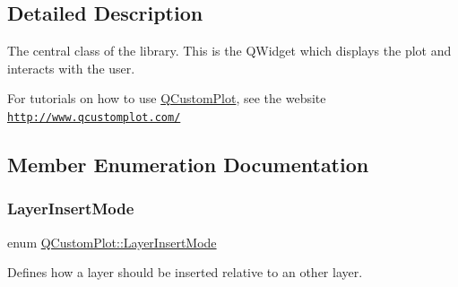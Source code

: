 \subsection{Detailed Description}
The central class of the library. This is the Q\+Widget which displays the plot and interacts with the user. 

For tutorials on how to use \hyperlink{class_q_custom_plot}{Q\+Custom\+Plot}, see the website~\newline
\href{http://www.qcustomplot.com/}{\tt http\+://www.\+qcustomplot.\+com/} 

\subsection{Member Enumeration Documentation}
\mbox{\label{class_q_custom_plot_a75a8afbe6ef333b1f3d47abb25b9add7}} 
\subsubsection{\texorpdfstring{Layer\+Insert\+Mode}{LayerInsertMode}\hspace{0.1cm}{\footnotesize\ttfamily [1/2]}}
{\footnotesize\ttfamily enum \hyperlink{class_q_custom_plot_a75a8afbe6ef333b1f3d47abb25b9add7}{Q\+Custom\+Plot\+::\+Layer\+Insert\+Mode}}

Defines how a layer should be inserted relative to an other layer.


